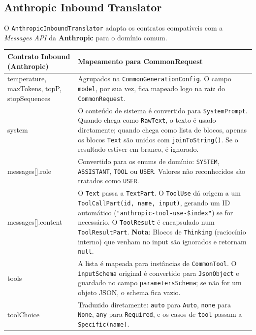 \subsection{\textbf{Anthropic} Inbound Translator}

O \texttt{AnthropicInboundTranslator} adapta os contratos compatíveis com a \textit{Messages API} da \textbf{Anthropic} para o domínio comum.

\begin{table}[H]
    \centering
    \footnotesize
    \renewcommand{\arraystretch}{1.25}
    \begin{tabularx}{\textwidth}{|>{\ttfamily\raggedright\arraybackslash}p{4.5cm}|Y|}
        \hline
        \textbf{Contrato Inbound (Anthropic)} & \textbf{Mapeamento para CommonRequest} \\
        \hline
        temperature, maxTokens, topP, stopSequences & Agrupados na \texttt{CommonGenerationConfig}. O campo \texttt{model}, por sua vez, fica mapeado logo na raiz do \texttt{CommonRequest}. \\
        \hline
        system & O conteúdo de sistema é convertido para \texttt{SystemPrompt}. Quando chega como \texttt{RawText}, o texto é usado diretamente; quando chega como lista de blocos, apenas os blocos \texttt{Text} são unidos com \texttt{joinToString()}. Se o resultado estiver em branco, é ignorado. \\
        \hline
        messages[].role & Convertido para os enums de domínio: \texttt{SYSTEM}, \texttt{ASSISTANT}, \texttt{TOOL} ou \texttt{USER}. Valores não reconhecidos são tratados como \texttt{USER}. \\
        \hline
        messages[].content & O \texttt{Text} passa a \texttt{TextPart}. O \texttt{ToolUse} dá origem a um \texttt{ToolCallPart(id, name, input)}, gerando um ID automático (\texttt{"anthropic-tool-use-\$index"}) se for necessário. O \texttt{ToolResult} é encapsulado num \texttt{ToolResultPart}. \textbf{Nota}: Blocos de \texttt{Thinking} (raciocínio interno) que venham no input são ignorados e retornam \texttt{null}. \\
        \hline
        tools & A lista é mapeada para instâncias de \texttt{CommonTool}. O \texttt{inputSchema} original é convertido para \texttt{JsonObject} e guardado no campo \texttt{parametersSchema}; se não for um objeto JSON, o schema fica vazio. \\
        \hline
        toolChoice & Traduzido diretamente: \texttt{auto} para \texttt{Auto}, \texttt{none} para \texttt{None}, \texttt{any} para \texttt{Required}, e os casos de \texttt{tool} passam a \texttt{Specific(name)}. \\

\end{tabularx}
\end{table}
